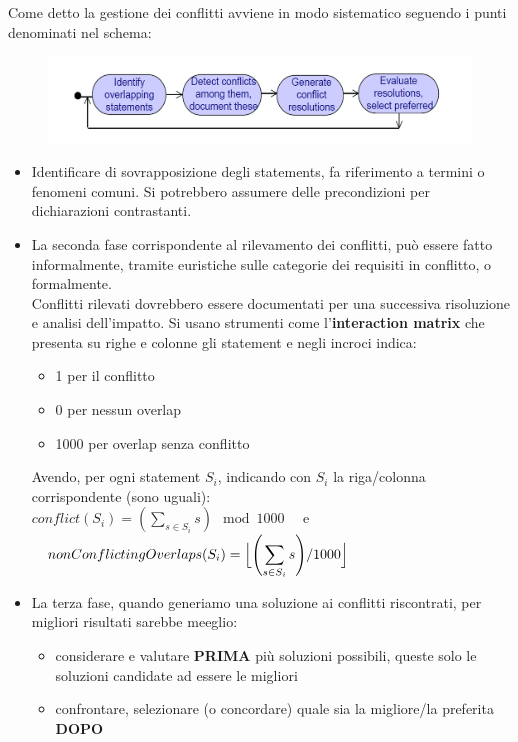 Come detto la gestione dei conflitti avviene in modo sistematico seguendo i punti denominati nel schema:
\begin{figure}[H]
    \centering
    \includegraphics[scale = 0.5]{Imm/manage_conflicts.PNG}
\end{figure}
\begin{itemize}
    \item Identificare di sovrapposizione degli statements, fa riferimento a termini o fenomeni comuni. Si potrebbero assumere delle precondizioni per dichiarazioni contrastanti.
    \item La seconda fase corrispondente al rilevamento dei conflitti, può essere fatto informalmente, tramite euristiche sulle categorie dei requisiti in conflitto, o formalmente. \\
    Conflitti rilevati dovrebbero essere documentati per una successiva risoluzione e analisi dell'impatto. Si usano strumenti come l'\textbf{interaction matrix} che presenta su righe e colonne gli statement e negli incroci indica: 
    \begin{itemize} 
        \item 1 per il conflitto 
        \item 0 per nessun overlap 
        \item 1000 per overlap senza conflitto 
    \end{itemize} 
    Avendo, per ogni statement $S_i$, indicando con $S_i$ la riga/colonna corrispondente (sono uguali):\\
    $conflict(S_i)= \displaystyle \left(\sum_{s\in S_i}s\right) \mod 1000\quad$ e 
    $\quad nonConflictingOverlaps(S_i)=  \displaystyle \Bigl\lfloor{ \left(\sum_{s\in S_i}s \right) } \// {1000}\Bigr\rfloor$
    \item La terza fase, quando generiamo una soluzione ai conflitti riscontrati, per migliori risultati sarebbe meeglio:
        \begin{itemize}
            \item considerare e valutare \textbf{PRIMA} più soluzioni possibili, queste solo le soluzioni candidate ad essere le migliori
            \item confrontare, selezionare (o concordare) quale sia la migliore/la preferita \textbf{DOPO}

\end{itemize}
\end{itemize}
